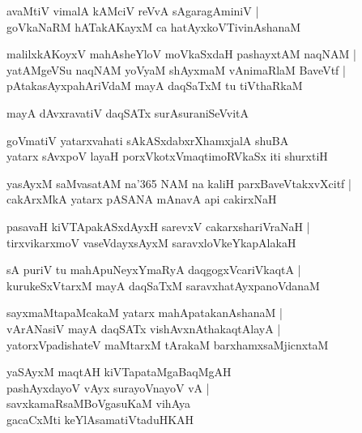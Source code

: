 \documentclass[twoside,12pt,openright]{book}
\newcounter{shloka}[chapter]
\begin{document}
\begin{shloka}%
avaMtiV vimalA kAMciV reVvA sAgaragAminiV |\\
goVkaNaRM hATakAKayxM ca hatAyxkoVTivinAshanaM 
\end{shloka}

\begin{shloka}%
malilxkAKoyxV mahAsheYloV moVkaSxdaH pashayxtAM naqNAM |\\
yatAMgeVSu naqNAM yoVyaM shAyxmaM vAnimaRlaM BaveVtf |\\
pAtakasAyxpahAriVdaM mayA daqSaTxM tu tiVthaRkaM 
\end{shloka}

\begin{shloka}%
mayA dAvxravatiV daqSATx surAsuraniSeVvitA 
\end{shloka}

\begin{shloka}%
goVmatiV yatarxvahati sAkASxdabxrXhamxjalA shuBA \\
yatarx sAvxpoV layaH porxVkotxVmaqtimoRVkaSx iti shurxtiH 
\end{shloka}

\begin{shloka}%
yasAyxM saMvasatAM na\char'365 NAM  na kaliH parxBaveVtakxvXcitf |\\
cakArxMkA yatarx pASANA mAnavA api cakirxNaH 
\end{shloka}

\begin{shloka}%
pasavaH kiVTApakASxdAyxH sarevxV cakarxshariVraNaH |\\
tirxvikarxmoV vaseVdayxsAyxM  saravxloVkeYkapAlakaH
\end{shloka}

\begin{shloka}%
sA puriV tu mahApuNeyxYmaRyA daqgogxVcariVkaqtA |\\
kurukeSxVtarxM mayA daqSaTxM saravxhatAyxpanoVdanaM 
\end{shloka}

\begin{shloka}%
sayxmaMtapaMcakaM yatarx mahApatakanAshanaM |\\
vArANasiV mayA daqSATx vishAvxnAthakaqtAlayA |\\
yatorxVpadishateV maMtarxM tArakaM barxhamxsaMjicnxtaM 
\end{shloka}

\begin{shloka}%
yaSAyxM maqtAH kiVTapataMgaBaqMgAH \\
pashAyxdayoV vAyx surayoVnayoV vA |\\
savxkamaRsaMBoVgasuKaM vihAya \\
gacaCxMti keYlAsamatiVtaduHKAH
\end{shloka}
\end{document}
